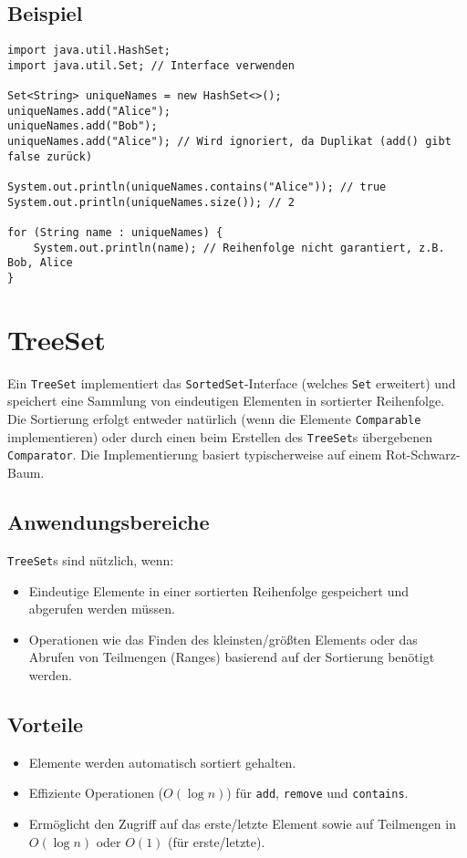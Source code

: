 \subsection{Beispiel}
\begin{lstlisting}[caption={Beispiel für die Verwendung eines HashSet in Java}, label=lst:hashSetExample]
import java.util.HashSet;
import java.util.Set; // Interface verwenden

Set<String> uniqueNames = new HashSet<>();
uniqueNames.add("Alice");
uniqueNames.add("Bob");
uniqueNames.add("Alice"); // Wird ignoriert, da Duplikat (add() gibt false zurück)

System.out.println(uniqueNames.contains("Alice")); // true
System.out.println(uniqueNames.size()); // 2

for (String name : uniqueNames) {
    System.out.println(name); // Reihenfolge nicht garantiert, z.B. Bob, Alice
}
\end{lstlisting}

\section{TreeSet}
Ein \texttt{TreeSet} implementiert das \texttt{SortedSet}-Interface (welches
\texttt{Set} erweitert) und speichert eine Sammlung von eindeutigen Elementen
in sortierter Reihenfolge. Die Sortierung erfolgt entweder natürlich (wenn die
Elemente \texttt{Comparable} implementieren) oder durch einen beim Erstellen
des \texttt{TreeSet}s übergebenen \texttt{Comparator}. Die Implementierung
basiert typischerweise auf einem Rot-Schwarz-Baum.

\subsection{Anwendungsbereiche}
\texttt{TreeSet}s sind nützlich, wenn:
\begin{itemize}
    \item Eindeutige Elemente in einer sortierten Reihenfolge gespeichert und abgerufen
          werden müssen.
    \item Operationen wie das Finden des kleinsten/größten Elements oder das Abrufen von
          Teilmengen (Ranges) basierend auf der Sortierung benötigt werden.
\end{itemize}

\subsection{Vorteile}
\begin{itemize}
    \item Elemente werden automatisch sortiert gehalten.
    \item Effiziente Operationen ($O(\log n)$) für \texttt{add}, \texttt{remove} und
          \texttt{contains}.
    \item Ermöglicht den Zugriff auf das erste/letzte Element sowie auf Teilmengen in
          $O(\log n)$ oder $O(1)$ (für erste/letzte).
\end{itemize}

